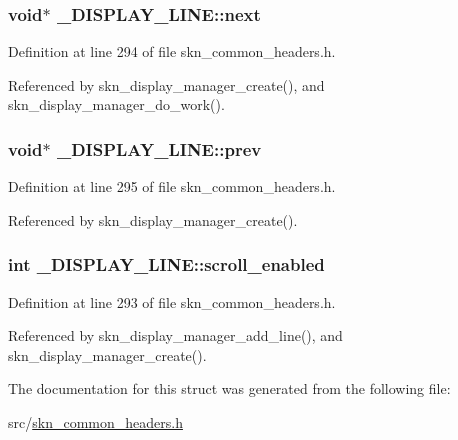 \subsubsection[{next}]{\setlength{\rightskip}{0pt plus 5cm}void$\ast$ \+\_\+\+D\+I\+S\+P\+L\+A\+Y\+\_\+\+L\+I\+N\+E\+::next}\label{struct___d_i_s_p_l_a_y___l_i_n_e_a0668a4de4eb91d9bbd03cc52b00f4fd0}


Definition at line 294 of file skn\+\_\+common\+\_\+headers.\+h.



Referenced by skn\+\_\+display\+\_\+manager\+\_\+create(), and skn\+\_\+display\+\_\+manager\+\_\+do\+\_\+work().

\hypertarget{struct___d_i_s_p_l_a_y___l_i_n_e_aadc57636aadef3cff11443217e7f50e5}{}
\subsubsection[{prev}]{\setlength{\rightskip}{0pt plus 5cm}void$\ast$ \+\_\+\+D\+I\+S\+P\+L\+A\+Y\+\_\+\+L\+I\+N\+E\+::prev}\label{struct___d_i_s_p_l_a_y___l_i_n_e_aadc57636aadef3cff11443217e7f50e5}


Definition at line 295 of file skn\+\_\+common\+\_\+headers.\+h.



Referenced by skn\+\_\+display\+\_\+manager\+\_\+create().

\hypertarget{struct___d_i_s_p_l_a_y___l_i_n_e_ad92346a9708f3f3ba0c45dfb891c18e3}{}
\subsubsection[{scroll\+\_\+enabled}]{\setlength{\rightskip}{0pt plus 5cm}int \+\_\+\+D\+I\+S\+P\+L\+A\+Y\+\_\+\+L\+I\+N\+E\+::scroll\+\_\+enabled}\label{struct___d_i_s_p_l_a_y___l_i_n_e_ad92346a9708f3f3ba0c45dfb891c18e3}


Definition at line 293 of file skn\+\_\+common\+\_\+headers.\+h.



Referenced by skn\+\_\+display\+\_\+manager\+\_\+add\+\_\+line(), and skn\+\_\+display\+\_\+manager\+\_\+create().



The documentation for this struct was generated from the following file\+:\begin{DoxyCompactItemize}
\item 
src/\hyperlink{skn__common__headers_8h}{skn\+\_\+common\+\_\+headers.\+h}\end{DoxyCompactItemize}
